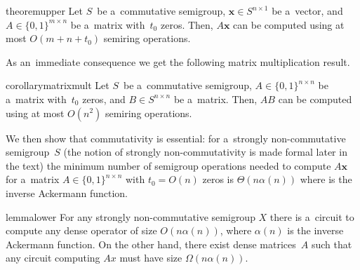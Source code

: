 \documentclass[11pt,letterpaper]{article}
\begin{document}
\begin{restatable}{theorem}{upper}
Let $S$~be a~commutative semigroup, 
$\mathbf{x} \in S^{n \times 1}$ be a~vector, 
and $A \in \{0,1\}^{m \times n}$ be a~matrix with~$t_0$ zeros.
Then, $A\mathbf{x}$ can be computed using at most 
$O(m+n+t_0)$ semiring operations.
\end{restatable}

As an~immediate consequence we get the following matrix 
multiplication result.

\begin{restatable}{corollary}{matrixmult}
Let $S$~be a~commutative semigroup, 
$A \in \{0,1\}^{n \times n}$ be a~matrix with~$t_0$ zeros,
and $B \in S^{n \times n}$ be a~matrix. Then, 
$AB$ can be computed using at most 
$O(n^2)$ semiring operations.
\end{restatable}

We then show that commutativity is essential: for 
a~strongly non-commutative semigroup~$S$ 
(the notion of strongly non-commutativity is made formal
later in the text) the minimum number of semigroup operations
needed to compute $A\mathbf{x}$ for a~matrix 
$A \in \{0,1\}^{n \times n}$ with $t_0=O(n)$ zeros is $\Theta(n\alpha(n))$ where is the inverse Ackermann function.

\begin{restatable}{lemma}{lower}
For any strongly non-commutative semigroup $X$ there is 
a~circuit to compute any dense operator of size $O(n\alpha(n))$, where $\alpha(n)$ is the inverse Ackermann function. On the other hand, there exist dense matrices~$A$ such that any circuit computing $Ax$ must have size $\Omega(n\alpha(n))$.
\end{restatable}
\end{document}
